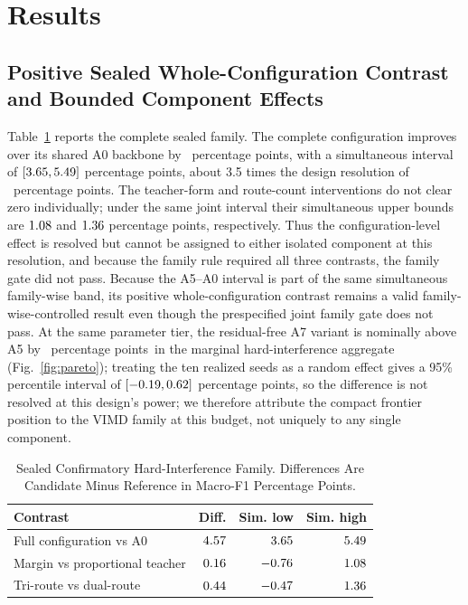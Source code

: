 \documentclass[letterpaper,journal]{IEEEtran}
\newcommand{\pp}{percentage points}
\begin{document}
\section{Results}
\subsection{Positive Sealed Whole-Configuration Contrast and Bounded
Component Effects}
Table~\ref{tab:confirmatory} reports the complete sealed family. The complete
configuration improves over its shared A0 backbone by \MethodEffectDiff\ \pp,
with a simultaneous interval of
$[3.65,5.49]$ \pp, about 3.5 times
the design resolution of \DesignResolution\ \pp. The teacher-form and
route-count interventions do not clear zero individually; under the same joint
interval their simultaneous upper bounds are $1.08$ and
$1.36$ \pp, respectively.
Thus the configuration-level effect is resolved but cannot be assigned to
either isolated component at this resolution, and because the family rule
required all three contrasts, the family gate did not pass. Because the
A5--A0 interval is part of the same simultaneous family-wise band, its
positive whole-configuration contrast remains a valid family-wise-controlled
result even though the prespecified joint family gate does not pass. At the same
parameter tier, the residual-free A7 variant is nominally above A5 by
\ASevenVsAFiveHardDiff\ \pp\ in the marginal hard-interference aggregate
(Fig.~\ref{fig:pareto}); treating the ten realized seeds as a random effect
gives a 95\% percentile interval of
$[-0.19,0.62]$ \pp, so the difference is not
resolved at this design's power; we therefore attribute the compact frontier
position to the VIMD family at this budget, not uniquely to any single
component.

\begin{table}[t]
\centering
\caption{Sealed Confirmatory Hard-Interference Family. Differences Are
Candidate Minus Reference in Macro-F1 Percentage Points.}
\label{tab:confirmatory}
\footnotesize
\setlength{\tabcolsep}{3.2pt}
\begin{tabular}{lrrr}
\toprule
Contrast & Diff. & Sim. low & Sim. high\\
\midrule
Full configuration vs A0 & $4.57$ & $3.65$ & $5.49$\\
Margin vs proportional teacher & $0.16$ & $-0.76$ & $1.08$\\
Tri-route vs dual-route & $0.44$ & $-0.47$ & $1.36$\\
\bottomrule
\end{tabular}
\end{table}
\end{document}

